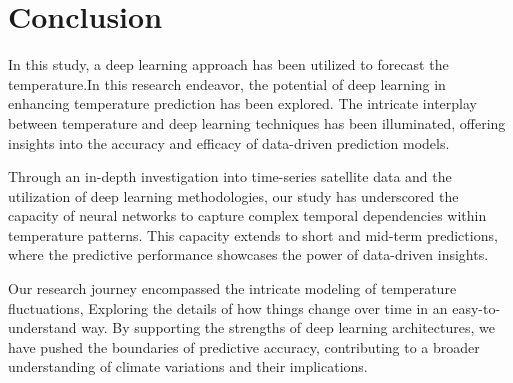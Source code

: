 \documentclass[sn-mathphys,Numbered]{sn-jnl}
\theoremstyle{thmstyleone}
\theoremstyle{thmstyletwo}
\theoremstyle{thmstylethree}
\begin{document}
\section{Conclusion}
In this study, a deep learning approach has been utilized to forecast the temperature.In this research endeavor, the potential of deep learning in enhancing temperature prediction has been explored. The intricate interplay between temperature and deep learning techniques has been illuminated, offering insights into the accuracy and efficacy of data-driven prediction models.

Through an in-depth investigation into time-series satellite data and the utilization of deep learning methodologies, our study has underscored the capacity of neural networks to capture complex temporal dependencies within temperature patterns. This capacity extends to short and mid-term predictions, where the predictive performance showcases the power of data-driven insights.

Our research journey encompassed the intricate modeling of temperature fluctuations, Exploring the details of how things change over time in an easy-to-understand way. By supporting the strengths of deep learning architectures, we have pushed the boundaries of predictive accuracy, contributing to a broader understanding of climate variations and their implications.



\end{document}
